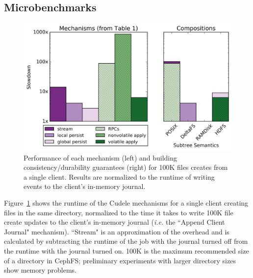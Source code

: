 \subsection{Microbenchmarks}
\label{sec:microbenchmarks}
\begin{figure}[tb]
\centering
\includegraphics[width=1.0\linewidth]{graphs/composable-mechanisms.png}
\caption{Performance of each mechanism (left) and building
consistency/durability guarantees (right) for 100K files creates from a single
client. Results are normalized to the runtime of writing events to the client's
in-memory journal.  \label{fig:composable-mechanisms}}
\end{figure}


Figure~\ref{fig:composable-mechanisms} shows the runtime of the Cudele
mechanisms for a single client creating files in the same directory, normalized
to the time it takes to write 100K file create updates to the client's
in-memory journal ({\it i.e.} the ``Append Client Journal" mechanism).
``Stream" is an approximation of the overhead and is calculated by subtracting
the runtime of the job with the journal turned off from the runtime with the
journal turned on.  100K is the maximum recommended size of a directory in
CephFS; preliminary experiments with larger directory sizes show memory
problems.

